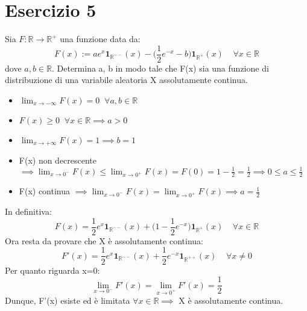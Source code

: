 \documentclass{article}
\begin{document}
\section*{Esercizio 5}
Sia $F: \mathbb{R} \to \mathbb{R}^+$ una funzione data da:
\[ F(x) := ae^{x}\mathbf{1}_{\mathbb{R}^{--}}(x) - \Big(\frac{1}{2}e^{-x}-b\Big)\mathbf{1}_{\mathbb{R}^{+}}(x) \; \; \; \; \forall x \in \mathbb{R} \]
dove $a,b \in \mathbb{R}$. Determina a, b in modo tale che F(x) sia una funzione di \\ distribuzione di una variabile aleatoria X assolutamente continua.
\\
\begin{itemize}
\item $\lim_{x\to -\infty}F(x) = 0 \; \; \forall a,b \in \mathbb{R}$
\item $F(x) \geq 0 \; \; \forall x \in \mathbb{R} \implies a>0$
\item $\lim_{x\to +\infty}F(x) = 1 \implies b=1$
\item F(x) non decrescente $\implies \lim_{x\to 0^{-}}F(x) \leq \lim_{x\to 0^{+}}F(x) = F(0) = 1-\frac{1}{2} = \frac{1}{2} \implies 0 \leq a \leq \frac{1}{2}$
\item F(x) continua $\implies \lim_{x\to 0^{-}}F(x) = \lim_{x\to 0^{+}}F(x) \implies a = \frac{1}{2}$
\end{itemize}
In definitiva:
\[ F(x) =  \frac{1}{2}e^{x}\mathbf{1}_{\mathbb{R}^{--}}(x) + \Big(1-\frac{1}{2}e^{-x}\Big)\mathbf{1}_{\mathbb{R}^{+}}(x) \; \; \; \; \forall x \in \mathbb{R} \]
Ora resta da provare che X è assolutamente continua:
\[ F'(x) =  \frac{1}{2}e^{x}\mathbf{1}_{\mathbb{R}^{--}}(x) + \frac{1}{2}e^{-x}\mathbf{1}_{\mathbb{R}^{++}}(x) \; \; \; \; \forall x \neq 0 \]
Per quanto riguarda x=0:
\[ \lim_{x\to 0^{-}}F'(x) = \lim_{x\to 0^{+}}F'(x) = \frac{1}{2} \]
Dunque, F'(x) esiste ed è limitata $\forall x \in \mathbb{R} \implies$ X è assolutamente continua.
\end{document}
